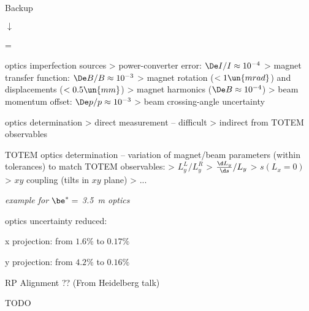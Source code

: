\hbox{}
\vfill
\centerline{Backup}
\centerline{$\downarrow$}

{
\footline={}

\newpage %
}

\vfil
\> optics imperfection sources
\>> power-converter error: $\De I / I \approx 10^{-4}$
\>> magnet transfer function: $\De B / B \approx 10^{-3}$
\>> magnet rotation ($<1\un{mrad}$) and displacements ($<0.5\un{mm}$)
\>> magnet harmonics ($\De B \approx 10^{-4}$)
\>> beam momentum offset: $\De p / p \approx 10^{-3}$
\>> beam crossing-angle uncertainty

\vfil
\> optics determination
\>> direct measurement -- difficult
\>> indirect from TOTEM observables

\vfil
\> TOTEM optics determination -- variation of magnet/beam parameters (within tolerances) to match TOTEM observables:
\>> $L_y^L / L_y^R$
\>> ${\d L_y\over \d s} / L_y$
\>> $s(L_x = 0)$
\>> $xy$ coupling (tilts in $xy$ plane)
\>> ...

\vfil

\newpage %

\centerline{\em{example for $\be^* = $ 3.5\ m optics}}

\vfil
{}

\vfil

\> optics uncertainty reduced:

\cBlack
\centerline{x projection: from $1.6\%$ to $0.17\%$}
\centerline{y projection: from $4.2\%$ to $0.16\%$}

\vfil

\cBlue
{\SmallerFonts
{}

}

\newpage %

\> RP Alignment ?? (From Heidelberg talk)

\newpage %

\> TODO

\vfil
\eject
\bye
